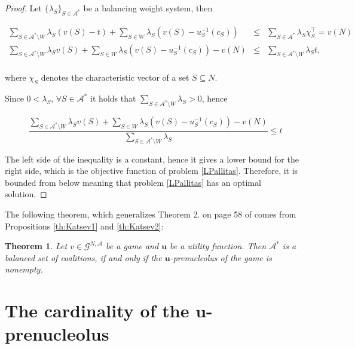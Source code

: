 \documentclass[a4paper,12pt]{article}
\newtheorem{theorem}{Theorem}
\theoremstyle{definition}
\theoremstyle{remark}
\begin{document}
\begin{proof}
Let $\{ \lambda_S\} _{S\in \mathcal{A}^\ast}$ be a balancing weight system, then %

\begin{eqnarray*}
\sum_{S\in \mathcal{A}^\ast \setminus W} \lambda_S (v(S)-t) + \sum_{S\in W} \lambda_S (v(S)-u_S^{-1}(c_S)) & \leq & \sum_{S\in \mathcal{A}^\ast} \lambda_S \chi_S^\top = v(N) \\
\sum_{S\in \mathcal{A}^\ast \setminus W} \lambda_S v(S) + \sum_{S\in W} \lambda_S (v(S)- u_S^{-1}(c_S)) - v(N) & \leq & \sum_{S\in \mathcal{A}^\ast \setminus W} \lambda_S t, \\
\end{eqnarray*}

\noindent where $\chi_S$ denotes the characteristic vector of a set $S\subseteq N$.

Since $0<\lambda_S$, $\forall S\in \mathcal{A}^\ast$ it holds that $\sum_{S\in \mathcal{A}^\ast \setminus W} \lambda_S >0$, hence

\begin{equation*}
\frac{\sum_{S\in \mathcal{A}^* \setminus W} \lambda_S v(S) + \sum_{S\in W} \lambda_S (v(S)- u_S^{-1}(c_S)) - v(N)}{\sum_{S\in \mathcal{A}^* \setminus W} \lambda_S} \leq t
\end{equation*}

The left side of the inequality is a constant, hence it gives a lower bound for the right side, which is the objective function of problem \eqref{LPallitas}. Therefore, it is bounded from below meaning that problem \eqref{LPallitas} has an optimal solution. 
\end{proof}

The following theorem, which generalizes Theorem 2. on page 58 of  \citet{Katsev2013} comes from Propositions \ref{th:Katsev1} and \ref{th:Katsev2}:

\begin{theorem}\label{th:Katsew}
Let $v\in \mathcal{G}^{N, \mathcal{A}}$ be a game and $\mathbf{u}$ be a utility function. Then $\mathcal{A}^\ast$ is a balanced set of coalitions, if and only if the $\mathbf{u}$-prenucleolus of the game is nonempty.
\end{theorem}

\section{The cardinality of the $\mathbf{u}$-prenucleolus}\label{sec:unicity}

\end{document}
